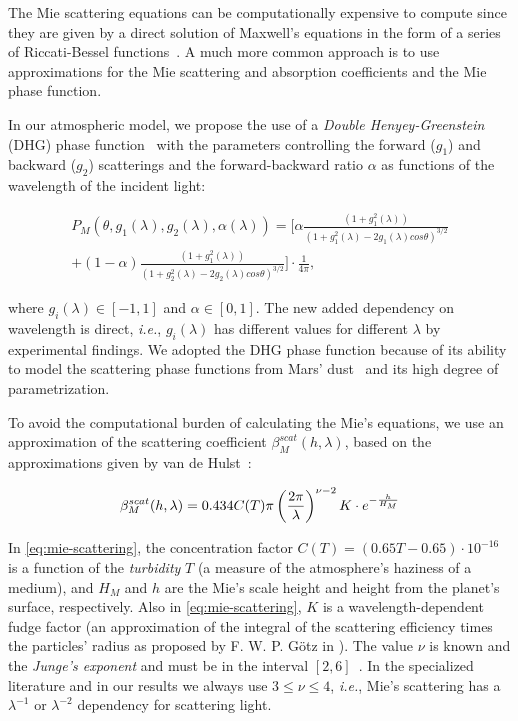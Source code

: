 \documentclass[journal]{vgtc}                %
\begin{document}
The Mie scattering equations can be computationally expensive to compute since they are given by a direct solution of Maxwell's equations in the form of a series of Riccati-Bessel functions~\cite{Hulst:1981, Mishchenko:2006}. A much more common approach is to use approximations for the Mie scattering and absorption coefficients and the Mie phase function.

In our atmospheric model, we propose the use of a \textit{Double Henyey-Greenstein} (DHG) phase function~\cite{Kattawar:1975} with the parameters controlling the forward ($g_1$) and backward ($g_2$) scatterings and the forward-backward ratio $\alpha$ as functions of the wavelength of the incident light:

\vspace*{-4.5mm}
{
  \small
\begin{multline}
P_M(\theta, g_1(\lambda), g_2(\lambda), \alpha(\lambda)) = \bigg[ \alpha\frac{(1+g_1^2(\lambda))}{(1+g_1^2(\lambda)-2g_1(\lambda)cos\theta)^{3/2}}\\
    + (1 - \alpha)\frac{(1+g_1^2(\lambda))}{(1+g_2^2(\lambda)-2g_2(\lambda)cos\theta)^{3/2}} \bigg] \cdot\frac{1}{4\pi},
\label{eq:phase-mie}    
\end{multline}
}
\vspace*{-3.5mm}

\noindent where $g_i(\lambda) \in [-1, 1]$ and $\alpha \in [0, 1]$. The new added dependency on wavelength is direct, \textit{i.e.}, $g_i(\lambda)$ has different values for different $\lambda$ by experimental findings.
%
We adopted the DHG phase function because of its ability to model the scattering phase functions from Mars' dust~\cite{Chen:2019} and its high degree of parametrization.

To avoid the computational burden of calculating the Mie's equations, we use an approximation of the scattering coefficient $\beta_M^{scat}(h, \lambda)$, based on the approximations given by van de Hulst~\cite{Hulst:1981}:

\vspace*{-3mm}
\begin{equation} \label{eq:mie-scattering}
  \small
  \beta_M^{scat}(h, \lambda) = 0.434 C(T) \pi \left( \frac{2\pi}{\lambda} \right)^{\nu-2} K \cdot e^{-\frac{h}{H_M}}
\end{equation}
\vspace*{-3mm}

In \autoref{eq:mie-scattering}, the concentration factor $C(T)=(0.65T-0.65) \cdot 10^{-16}$ \cite{Morales:2017} is a function of the \textit{turbidity} $T$ (a measure of the atmosphere's haziness of a medium), and $H_M$ and $h$ are the Mie's scale height and height from the planet's surface, respectively. 
Also in \autoref{eq:mie-scattering}, $K$ is a wavelength-dependent fudge factor (an approximation of the integral of the scattering efficiency times the particles' radius as proposed by F. W. P. G\"otz in \cite{VSNGBook:1944}). The value $\nu$ is known and the \textit{Junge's exponent} and must be in the interval $[2, 6]$~\cite{Hulst:1981}. In the specialized literature and in our results we always use $3 \leq \nu \leq 4$, \textit{i.e.}, Mie's scattering has a $\lambda^{-1}$ or $\lambda^{-2}$ dependency for scattering light.\\
\end{document}
